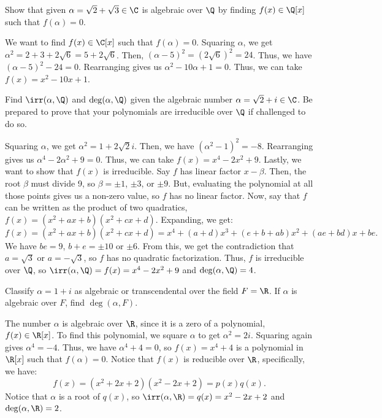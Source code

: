 \begin{problem}[39.2]
  Show that given $\alpha = \sqrt{2} + \sqrt{3} \in \C$ is algebraic over $\Q$ by finding $f(x) \in \Q[x]$ such that $f(\alpha) = 0$.
\end{problem}

\begin{solution}
  We want to find $f(x) \in \C[x]$ such that $f(\alpha) = 0$. Squaring $\alpha$, we get $\alpha^2 = 2 + 3 + 2\sqrt{6} = 5 + 2\sqrt{6}$. Then, $(\alpha - 5)^2 = (2\sqrt{6})^2 = 24$. Thus, we have $(\alpha - 5)^2 - 24 = 0$. Rearranging gives us $\alpha^2 - 10\alpha + 1 = 0$. Thus, we can take $f(x) = x^2 - 10x + 1$.
\end{solution}

\begin{problem}[39.8]
  Find $\irr(\alpha, \Q)$ and $\deg(\alpha, \Q)$ given the algebraic number $\alpha = \sqrt{2} + i \in \C$. Be prepared to prove that your polynomials are irreducible over $\Q$ if challenged to do so.
\end{problem}

\begin{solution}
  Squaring $\alpha$, we get $\alpha^2 = 1 + 2\sqrt{2}i$. Then, we have $(\alpha^2 - 1)^2 = -8$. Rearranging gives us $\alpha^4 - 2\alpha^2 + 9 = 0$. Thus, we can take $f(x) = x^4 - 2x^2 + 9$. Lastly, we want to show that $f(x)$ is irreducible. Say $f$ has linear factor $x - \beta$. Then, the root $\beta$ must divide 9, so $\beta = \pm 1$, $\pm 3$, or $\pm 9$. But, evaluating the polynomial at all those points gives us a non-zero value, so $f$ has no linear factor. Now, say that $f$ can be written as the product of two quadratics, $f(x) = (x^2 + ax + b)(x^2 + cx + d)$. Expanding, we get:
  \[%
    f(x) = (x^2 + ax + b)(x^2 + cx + d) = x^4 + (a + d)x^3 + (e + b + ab)x^2 + (ae + bd)x + be
  .\]%
  We have $be = 9$, $b + e = \pm 10$ or $\pm 6$. From this, we get the contradiction that $a = \sqrt{3}$ or $a = -\sqrt{3}$, so $f$ has no quadratic factorization. Thus, $f$ is irreducible over $\Q$, so $\irr(\alpha, \Q) = f(x) = x^4 - 2x^2 + 9$ and $\deg(\alpha, \Q) = 4$.
\end{solution}

\begin{problem}[39.10]
  Classify $\alpha = 1 + i$ as algebraic or transcendental over the field $F = \R$. If $\alpha$ is algebraic over $F$, find $\deg(\alpha, F)$.
\end{problem}

\begin{solution}
  The number $\alpha$ is algebraic over $\R$, since it is a zero of a polynomial, $f(x) \in \R[x]$. To find this polynomial, we square $\alpha$ to get $\alpha^2 = 2i$. Squaring again gives $\alpha^4 = -4$. Thus, we have $\alpha^4 + 4 = 0$, so $f(x) = x^4 + 4$ is a polynomial in $\R[x]$ such that $f(\alpha) = 0$. Notice that $f(x)$ is reducible over $\R$, specifically, we have:
  \[%
    f(x) = \left(x^2 + 2x + 2\right)\left(x^2 - 2x + 2\right) = p(x)q(x)
  .\]%
  Notice that $\alpha$ is a root of $q(x)$, so $\irr(\alpha, \R) = q(x) = x^2 - 2x + 2$ and $\deg(\alpha, \R) = 2$.
\end{solution}

